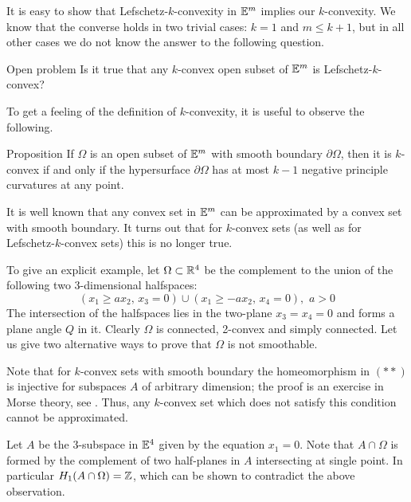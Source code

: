 \documentclass[oneside,a4paper]{article}
\begin{document}
It is easy to show that Lefschetz-$k$-convexity in $\mathbb{E}^m$ implies our $k$-convexity.
We know that the converse holds in two trivial cases: $k=1$ and $m\le k+1$,
but in all other cases we do not know the answer to the following question.

\begin{thm}{Open problem}
Is it true that any $k$-convex open subset of $\mathbb{E}^m$ is Lefschetz-$k$-convex?
\end{thm}

To get a feeling of the definition of $k$-convexity,
it is useful to observe the following.

\begin{thm}{Proposition}\label{prop:smooth}
If $\Omega$ is an open subset of $\mathbb{E}^m$ with smooth boundary $\partial\Omega$,
then it is $k$-convex if and only if the hypersurface
$\partial\Omega$ has at most $k-1$ negative principle curvatures at any point.
\end{thm}

It is well known that any convex set in $\mathbb{E}^m$ can be approximated
 by a convex set with smooth boundary.
It turns out that for $k$-convex sets (as well as for Lefschetz-$k$-convex sets)
this is no longer true.

To give an explicit example, let $\Omega\subset\mathbb{R}^4$ be the complement to the union of the following two 3-dimensional halfspaces: $$(x_1\ge ax_2, \, x_3=0)\cup(x_1\ge -ax_2,\,x_4=0),\,\, a>0$$
The intersection of the halfspaces lies in the two-plane $x_3=x_4=0$ and 
forms a plane angle $Q$ in it.
Clearly $\Omega$ is connected, 2-convex and simply connected.
Let us give two alternative ways to prove that $\Omega$ is not smoothable.

Note that for $k$-convex sets with smooth boundary the homeomorphism in $({*}{*})$ is injective for subspaces $A$ of arbitrary dimension;
the proof is an exercise in Morse theory, see \cite[Section~$\tfrac12$]{gromov}.
Thus, any $k$-convex set which does not satisfy this condition cannot be approximated.

Let $A$ be the 3-subspace in $\mathbb{E}^4$ given by the equation 
$x_1=0$.
Note that $A\cap\Omega$ is formed by the complement of
two half-planes in $A$ intersecting at single point.
In particular $H_1(A\cap\Omega)=\mathbb{Z}$, 
which can be shown to contradict the above observation.
\end{document}
